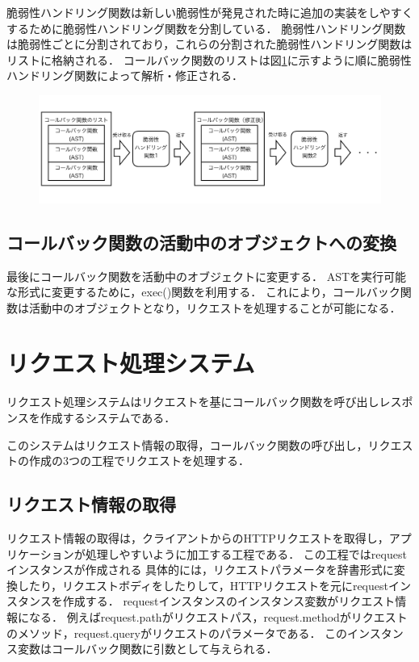 \documentclass[a4paper,12pt]{jreport}
\begin{document}
脆弱性ハンドリング関数は新しい脆弱性が発見された時に追加の実装をしやすくするために脆弱性ハンドリング関数を分割している．
脆弱性ハンドリング関数は脆弱性ごとに分割されており，これらの分割された脆弱性ハンドリング関数はリストに格納される．
コールバック関数のリストは図\ref{fig:vh_funcs}に示すように順に脆弱性ハンドリング関数によって解析・修正される．
\begin{figure}[ht]
  \begin{center}
    \includegraphics[clip, width=130mm]{./figures/splited_vhfunction.png}
    \label{fig:vh_funcs}
  \end{center}
\end{figure}

\subsection{コールバック関数の活動中のオブジェクトへの変換}
最後にコールバック関数を活動中のオブジェクトに変更する．
ASTを実行可能な形式に変更するために，exec()関数を利用する．
これにより，コールバック関数は活動中のオブジェクトとなり，リクエストを処理することが可能になる．

\section{リクエスト処理システム}
リクエスト処理システムはリクエストを基にコールバック関数を呼び出しレスポンスを作成するシステムである．

このシステムはリクエスト情報の取得，コールバック関数の呼び出し，リクエストの作成の3つの工程でリクエストを処理する．

\subsection{リクエスト情報の取得}
リクエスト情報の取得は，クライアントからのHTTPリクエストを取得し，アプリケーションが処理しやすいように加工する工程である．
この工程ではrequestインスタンスが作成される
具体的には，リクエストパラメータを辞書形式に変換したり，リクエストボディをしたりして，HTTPリクエストを元にrequestインスタンスを作成する．
requestインスタンスのインスタンス変数がリクエスト情報になる．
例えばrequest.pathがリクエストパス，request.methodがリクエストのメソッド，request.queryがリクエストのパラメータである．
このインスタンス変数はコールバック関数に引数として与えられる．
\end{document}
